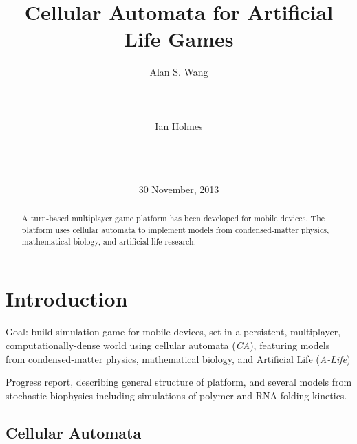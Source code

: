 \documentclass{acm_proc_article-sp}
\begin{document}
\title{Cellular Automata for Artificial Life Games}
\author{
\alignauthor
Alan S. Wang\\
       \\
       \\
       \\
\alignauthor
Ian Holmes\\
       \\
       \\
       \\
}
\date{30 November, 2013}

\maketitle
\begin{abstract}
A turn-based multiplayer game platform has been developed for mobile devices.
The platform uses cellular automata to implement models
from condensed-matter physics, mathematical biology,
and artificial life research.
\end{abstract}



\section{Introduction}

Goal: 
build simulation game for mobile devices,
set in a persistent, multiplayer, computationally-dense world
using cellular automata ({\em CA}),
featuring models from
condensed-matter physics,
mathematical biology,
 and
Artificial Life ({\em A-Life})

Progress report, describing general structure of platform,
and several models from stochastic biophysics
including simulations of polymer and RNA folding kinetics.

\subsection{Cellular Automata}
\end{document}
